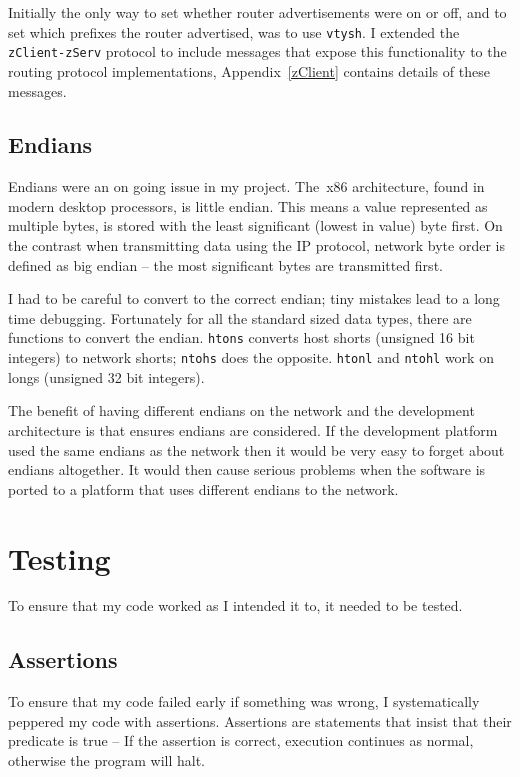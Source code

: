 Initially the only way to set whether router advertisements were on or off, and
to set which prefixes the router advertised, was to use \texttt{vtysh}. I
extended the \texttt{zClient-zServ} protocol to include messages that expose
this functionality to the routing protocol implementations,
Appendix~\ref{zClient} contains details of these messages. 

\section{Endians}
Endians were an on going issue in my project. The\ x86 architecture, found in
modern desktop processors, is little endian.  This means a value represented as
multiple bytes, is stored with the least significant (lowest in value) byte
first. On the contrast when transmitting data using the IP protocol, network
byte order is defined as big endian -- the most significant bytes are
transmitted first. 

I had to be careful to convert to the correct endian; tiny mistakes lead
to a long time debugging. Fortunately for all the standard sized data types,
there are functions to convert the endian.  \texttt{htons} converts host shorts
(unsigned 16 bit integers) to network shorts; \texttt{ntohs} does the opposite.
\texttt{htonl} and \texttt{ntohl} work on longs (unsigned 32 bit integers). 

The benefit of having different endians on the network and the development
architecture is that ensures endians are considered. If the development platform
used the same endians as the network then it would be very easy to forget about
endians altogether. It would then cause serious problems when the software is
ported to a platform that uses different endians to the network.
    
\chapter{Testing}
To ensure that my code worked as I intended it to, it needed to be tested. 

\section{Assertions}
To ensure that my code failed early if something was wrong, I systematically
peppered my code with assertions. Assertions are statements that insist that
their predicate is true -- If the assertion is correct, execution continues as
normal, otherwise the program will halt.

